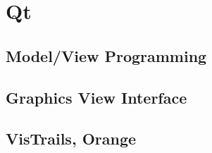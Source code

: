 \newpage
\section{Qt}

\subsection{Model/View Programming}
\subsection{Graphics View Interface}
\subsection{VisTrails, Orange}